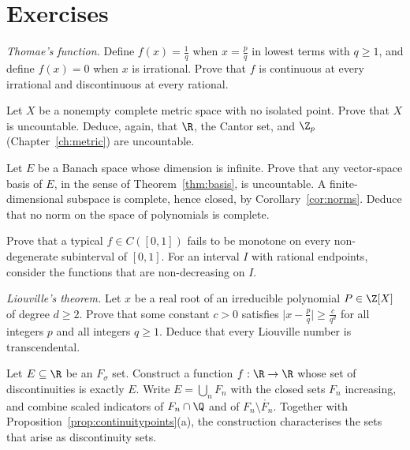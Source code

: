 \section{Exercises}

\begin{exercise}[$\star$]\label{ex:thomae}
\emph{Thomae's function.} Define $f(x)=\frac1q$ when $x=\frac pq$ in lowest terms with $q\ge1$, and define $f(x)=0$ when $x$ is irrational. Prove that $f$ is continuous at every irrational and discontinuous at every rational.
\end{exercise}

\begin{exercise}[$\star$]\label{ex:perfect}
Let $X$ be a nonempty complete metric space with no isolated point. Prove that $X$ is uncountable. Deduce, again, that $\R$, the Cantor set, and $\Z_p$ (Chapter~\ref{ch:metric}) are uncountable.
\end{exercise}

\begin{exercise}[$\star\star$]\label{ex:hamelbanach}
Let $E$ be a Banach space whose dimension is infinite. Prove that any vector-space basis of $E$, in the sense of Theorem~\ref{thm:basis}, is uncountable. A finite-dimensional subspace is complete, hence closed, by Corollary~\ref{cor:norms}. Deduce that no norm on the space of polynomials is complete.
\end{exercise}

\begin{exercise}[$\star\star$]\label{ex:monotone2}
Prove that a typical $f\in C([0,1])$ fails to be monotone on every non-degenerate subinterval of $[0,1]$. For an interval $I$ with rational endpoints, consider the functions that are non-decreasing on $I$.
\end{exercise}

\begin{exercise}[$\star\star$]\label{ex:liouville}
\emph{Liouville's theorem.} Let $x$ be a real root of an irreducible polynomial $P\in\Z[X]$ of degree $d\ge2$. Prove that some constant $c>0$ satisfies $\bigl|x-\frac pq\bigr|\ge\frac c{q^d}$ for all integers $p$ and all integers $q\ge1$. Deduce that every Liouville number is transcendental.
\end{exercise}

\begin{exercise}[$\star\star$]\label{ex:fsigma}
Let $E\subseteq\R$ be an $F_\sigma$ set. Construct a function $f:\R\to\R$ whose set of discontinuities is exactly $E$. Write $E=\bigcup_n F_n$ with the closed sets $F_n$ increasing, and combine scaled indicators of $F_n\cap\Q$ and of $F_n\setminus\mathring{F_n}$. Together with Proposition~\ref{prop:continuitypoints}(a), the construction characterises the sets that arise as discontinuity sets.
\end{exercise}


